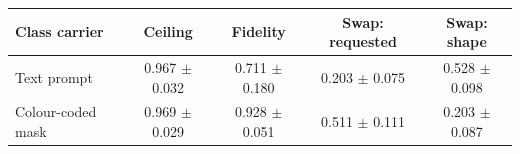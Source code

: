 \begin{tabular}{@{}lcccc@{}}
\toprule
\textbf{Class carrier} & \textbf{Ceiling} & \textbf{Fidelity} & \textbf{Swap: requested} & \textbf{Swap: shape} \\
\midrule
        Text prompt & 0.967 $\pm$ 0.032 & 0.711 $\pm$ 0.180 & 0.203 $\pm$ 0.075 & 0.528 $\pm$ 0.098 \\
        Colour-coded mask & 0.969 $\pm$ 0.029 & 0.928 $\pm$ 0.051 & 0.511 $\pm$ 0.111 & 0.203 $\pm$ 0.087 \\
\bottomrule
\end{tabular}
